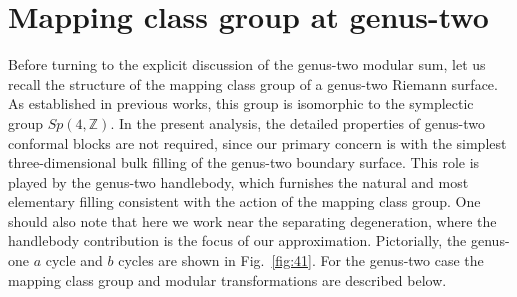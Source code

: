 \documentclass[12 pt]{article}
\begin{document}
\section{Mapping class group at genus-two}\label{sec3}
Before turning to the explicit discussion of the genus-two modular sum, let us recall the structure of the mapping class group of a genus-two Riemann surface. As established in previous works, this group is isomorphic to the symplectic group $Sp(4,\mathbb{Z})$. In the present analysis, the detailed properties of genus-two conformal blocks are not required, since our primary concern is with the simplest three-dimensional bulk filling of the genus-two boundary surface. This role is played by the genus-two handlebody, which furnishes the natural and most elementary filling consistent with the action of the mapping class group. One should also note that here we work near the separating degeneration, where the handlebody contribution is the focus of our approximation. Pictorially, the genus-one $a$ cycle and $b$ cycles are shown in Fig.~\eqref{fig:41}. For the genus-two case the mapping class group and modular transformations are described below.
\end{document}
